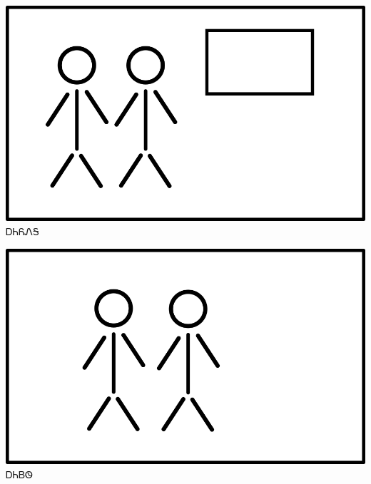\documentclass[avery5371]{flashcards}%
\begin{document}
    \begin{flashcard}{
        \includegraphics[width=0.95\columnwidth,height=.51\columnwidth,keepaspectratio]{../artwork/flags/aniyonega-flag}
    }
        \Huge ᎠᏂᏲᏁᎦ
    \end{flashcard}

    \begin{flashcard}{
        \includegraphics[width=0.95\columnwidth,height=.51\columnwidth,keepaspectratio]{../artwork/flags/aniyvwi-no-flag}
    }
        \Huge ᎠᏂᏴᏫ
    \end{flashcard}
\end{document}
